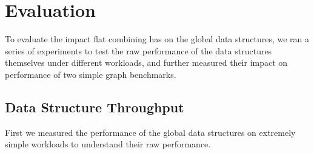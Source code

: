 \section{Evaluation}
To evaluate the impact flat combining has on the global data structures, we ran a series of experiments to test the raw performance of the data structures themselves under different workloads, and further measured their impact on performance of two simple graph benchmarks.

\subsection{Data Structure Throughput}
First we measured the performance of the global data structures on extremely simple workloads to understand their raw performance.

